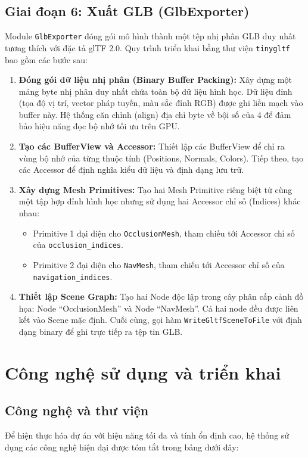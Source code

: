 \documentclass[a4paper,12pt]{report}
\begin{document}
\section{Giai đoạn 6: Xuất GLB (GlbExporter)}
Module \texttt{GlbExporter} đóng gói mô hình thành một tệp nhị phân GLB duy nhất tương thích với đặc tả glTF 2.0. Quy trình triển khai bằng thư viện \texttt{tinygltf} bao gồm các bước sau:
\begin{enumerate}
    \item \textbf{Đóng gói dữ liệu nhị phân (Binary Buffer Packing):}
    Xây dựng một mảng byte nhị phân duy nhất chứa toàn bộ dữ liệu hình học. Dữ liệu đỉnh (tọa độ vị trí, vector pháp tuyến, màu sắc đỉnh RGB) được ghi liền mạch vào buffer này. Hệ thống căn chỉnh (align) địa chỉ byte về bội số của 4 để đảm bảo hiệu năng đọc bộ nhớ tối ưu trên GPU.
    \item \textbf{Tạo các BufferView và Accessor:}
    Thiết lập các BufferView để chỉ ra vùng bộ nhớ của từng thuộc tính (Positions, Normals, Colors). Tiếp theo, tạo các Accessor để định nghĩa kiểu dữ liệu và định dạng lưu trữ.
    \item \textbf{Xây dựng Mesh Primitives:}
    Tạo hai Mesh Primitive riêng biệt từ cùng một tập hợp đỉnh hình học nhưng sử dụng hai Accessor chỉ số (Indices) khác nhau:
    \begin{itemize}
        \item Primitive 1 đại diện cho \texttt{OcclusionMesh}, tham chiếu tới Accessor chỉ số của \texttt{occlusion\_indices}.
        \item Primitive 2 đại diện cho \texttt{NavMesh}, tham chiếu tới Accessor chỉ số của \texttt{navigation\_indices}.
    \end{itemize}
    \item \textbf{Thiết lập Scene Graph:}
    Tạo hai Node độc lập trong cây phân cấp cảnh đồ họa: Node ``OcclusionMesh'' và Node ``NavMesh''. Cả hai node đều được liên kết vào Scene mặc định. Cuối cùng, gọi hàm \texttt{WriteGltfSceneToFile} với định dạng binary để ghi trực tiếp ra tệp tin GLB.
\end{enumerate}

\chapter{Công nghệ sử dụng và triển khai}

\section{Công nghệ và thư viện}
Để hiện thực hóa dự án với hiệu năng tối đa và tính ổn định cao, hệ thống sử dụng các công nghệ hiện đại được tóm tắt trong bảng dưới đây:
\end{document}
